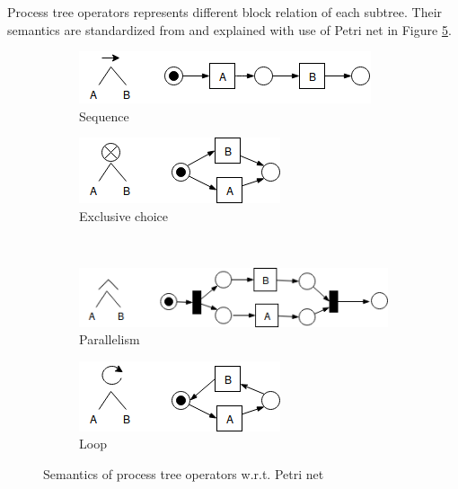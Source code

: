 Process tree operators represents different block relation of each subtree. Their semantics are standardized from \cite{vanderAalst:2016:PMD:2948762, Buijs2012OnTR} and explained with use of Petri net in Figure \ref{fig:pn_pt_correspondings}\cite{Buijs2012OnTR}.
\begin{figure}[!h]
	\centering
	\begin{subfigure}[b]{0.45\textwidth}
		\centering
		\includegraphics[width=\linewidth]{figures/preliminary/PT_PN_corresponding_01_seq_PN.png}
		\caption{Sequence}
		\label{fig:pt_pn_seq}
	\end{subfigure}%
	\quad
	\begin{subfigure}[b]{0.45\textwidth}
		\centering
		\includegraphics[width=\linewidth]{figures/preliminary/PT_PN_corresponding_02_xor_PN.png}
		\caption{Exclusive choice}
		\label{fig:pt_pn_xor}
	\end{subfigure}%
	\\ %
	\begin{subfigure}[b]{0.45\textwidth}
		\centering
		\includegraphics[width=\linewidth]{figures/preliminary/PT_PN_corresponding_03_and_PN.png}
		\caption{ Parallelism }
		\label{fig:pt_pn_and}
	\end{subfigure}%
	\quad
	\begin{subfigure}[b]{0.45\textwidth}
		\centering
		\includegraphics[width=\linewidth]{figures/preliminary/PT_PN_corresponding_04_loop_PN.png}
		\caption{Loop}
		\label{fig:pt_pn_loop}
	\end{subfigure}%
	\caption{Semantics of process tree operators w.r.t. Petri net}
	\label{fig:pn_pt_correspondings}
\end{figure}

